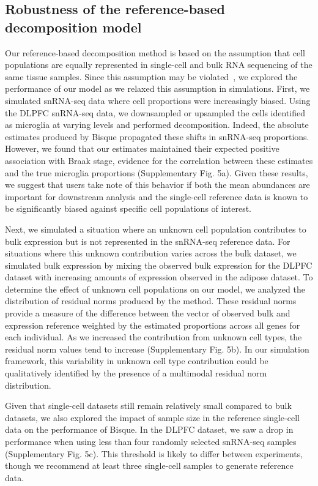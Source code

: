 \subsection{Robustness of the reference-based decomposition model}

Our reference-based decomposition method is based on the assumption that cell populations are equally represented in single-cell and bulk RNA sequencing of the same tissue samples. Since this assumption may be violated~\cite{Schelker2017-ms}, we explored the performance of our model as we relaxed this assumption in simulations. First, we simulated snRNA-seq data where cell proportions were increasingly biased. Using the DLPFC snRNA-seq data, we downsampled or upsampled the cells identified as microglia at varying levels and performed decomposition. Indeed, the absolute estimates produced by Bisque propagated these shifts in snRNA-seq proportions. However, we found that our estimates maintained their expected positive association with Braak stage, evidence for the correlation between these estimates and the true microglia proportions (Supplementary Fig. 5a).  Given these results, we suggest that users take note of this behavior if both the mean abundances are important for downstream analysis and the single-cell reference data is known to be significantly biased against specific cell populations of interest.
 
Next, we simulated a situation where an unknown cell population contributes to bulk expression but is not represented in the snRNA-seq reference data. For situations where this unknown contribution varies across the bulk dataset, we simulated bulk expression by mixing the observed bulk expression for the DLPFC dataset with increasing amounts of expression observed in the adipose dataset. To determine the effect of unknown cell populations on our model, we analyzed the distribution of residual norms produced by the method. These residual norms provide a measure of the difference between the vector of observed bulk and expression reference weighted by the estimated proportions across all genes for each individual. As we increased the contribution from unknown cell types, the residual norm values tend to increase (Supplementary Fig. 5b). In our simulation framework, this variability in unknown cell type contribution could be qualitatively identified by the presence of a multimodal residual norm distribution. 

Given that single-cell datasets still remain relatively small compared to bulk datasets, we also explored the impact of sample size in the reference single-cell data on the performance of Bisque. In the DLPFC dataset, we saw a drop in performance when using less than four randomly selected snRNA-seq samples (Supplementary Fig. 5c). This threshold is likely to differ between experiments, though we recommend at least three single-cell samples to generate reference data. 

